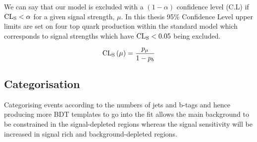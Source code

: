 We can say that our model is excluded with a $\left(1-\alpha \right)$ confidence level (C.L) if ${\textrm{CL}}_{\textrm{S}} < \alpha$ for a given signal strength, $\mu$. In this thesis 95\% Confidence Level upper limits are set on four top quark production 
within the standard model which corresponds to signal strengths which have ${\textrm{CL}}_{\textrm{S}} < 0.05$ being excluded.

\begin{equation}
{\textrm{CL}}_{\textrm{S}}\left(\mu\right) = \frac{p_{\mu}}{1-p_{b}}
\label{eqn:CLS}
\end{equation}











\subsection{Categorisation}
\label{sec:Cats}

Categorising events according to the numbers of jets and b-tags and hence producing more BDT templates to go into the fit allows the main \ttbar background to be constrained in the signal-depleted regions whereas the signal sensitivity will be increased in signal rich and background-depleted regions.


